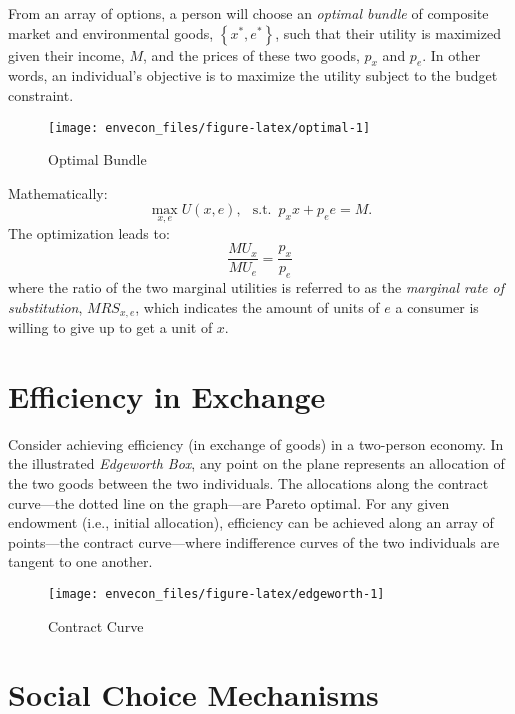 \documentclass[
]{book}
\begin{document}
From an array of options, a person will choose an \emph{optimal bundle} of composite market and environmental goods, \(\left\{x^*,e^*\right\}\), such that their utility is maximized given their income, \(M\), and the prices of these two goods, \(p_x\) and \(p_e\). In other words, an individual's objective is to maximize the utility subject to the budget constraint.

\begin{figure}

{\centering \texttt{[image: envecon\_files/figure-latex/optimal-1]} 

}

\caption{Optimal Bundle}\label{fig:optimal}
\end{figure}

Mathematically: \[\max_{x,e}U(x,e),\;~~\mbox{s.t.}\;~p_{x}x+p_{e}e=M.\] The optimization leads to: \[\frac{MU_x}{MU_e} = \frac{p_x}{p_e}\] where the ratio of the two marginal utilities is referred to as the \emph{marginal rate of substitution}, \(MRS_{x,e}\), which indicates the amount of units of \(e\) a consumer is willing to give up to get a unit of \(x\).

\hypertarget{efficiency-in-exchange}{%
\section{Efficiency in Exchange}\label{efficiency-in-exchange}}

Consider achieving efficiency (in exchange of goods) in a two-person economy. In the illustrated \emph{Edgeworth Box}, any point on the plane represents an allocation of the two goods between the two individuals. The allocations along the contract curve---the dotted line on the graph---are Pareto optimal. For any given endowment (i.e., initial allocation), efficiency can be achieved along an array of points---the contract curve---where indifference curves of the two individuals are tangent to one another.

\begin{figure}

{\centering \texttt{[image: envecon\_files/figure-latex/edgeworth-1]} 

}

\caption{Contract Curve}\label{fig:edgeworth}
\end{figure}

\hypertarget{social-choice-mechanisms}{%
\section{Social Choice Mechanisms}\label{social-choice-mechanisms}}
\end{document}
